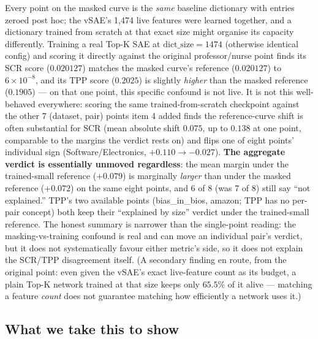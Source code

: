 \documentclass[11pt]{article}
\begin{document}
\begin{enumerate}
  Every point on the masked curve is the \emph{same} baseline dictionary
  with entries zeroed post hoc; the vSAE's 1,474 live features were learned
  together, and a dictionary trained from scratch at that exact size might
  organise its capacity differently. Training a real Top-K SAE at
  $\mathrm{dict\_size}=1474$ (otherwise identical config) and scoring it
  directly against the original professor/nurse point finds its SCR score
  ($0.020127$) matches the masked curve's reference ($0.020127$) to
  $6\times10^{-8}$, and its TPP score ($0.2025$) is slightly \emph{higher}
  than the masked reference ($0.1905$) --- on that one point, this specific
  confound is not live. It is not this well-behaved everywhere: scoring the
  same trained-from-scratch checkpoint against the other 7 (dataset, pair)
  points item 4 added finds the reference-curve shift is often substantial
  for SCR (mean absolute shift $0.075$, up to $0.138$ at one point,
  comparable to the margins the verdict rests on) and flips one of eight
  points' individual sign (Software/Electronics, $+0.110\to-0.027$).
  \textbf{The aggregate verdict is essentially unmoved regardless}: the mean
  margin under the trained-small reference ($+0.079$) is marginally
  \emph{larger} than under the masked reference ($+0.072$) on the same
  eight points, and 6 of 8 (was 7 of 8) still say ``not explained.'' TPP's
  two available points (bias\_in\_bios, amazon; TPP has no per-pair concept)
  both keep their ``explained by size'' verdict under the trained-small
  reference. The honest summary is narrower than the single-point reading:
  the masking-vs-training confound is real and can move an individual
  pair's verdict, but it does not systematically favour either metric's
  side, so it does not explain the SCR/TPP disagreement itself. (A
  secondary finding en route, from the original point: even given the
  vSAE's exact live-feature count as its budget, a plain Top-K network
  trained at that size keeps only $65.5\%$ of it alive --- matching a
  feature \emph{count} does not guarantee matching how efficiently a
  network uses it.)
\end{enumerate}

\subsection{What we take this to show}
\end{document}
